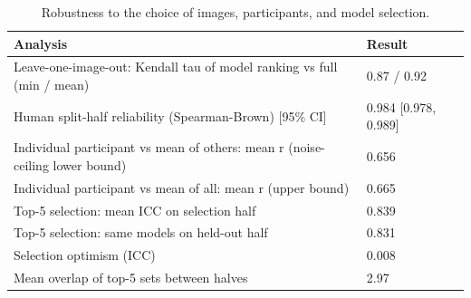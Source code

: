 \begin{table}
\caption{Robustness to the choice of images, participants, and model selection.}
\begin{tabular}{ll}
\toprule
Analysis & Result \\
\midrule
Leave-one-image-out: Kendall tau of model ranking vs full (min / mean) & 0.87 / 0.92 \\
Human split-half reliability (Spearman-Brown) [95\% CI] & 0.984 [0.978, 0.989] \\
Individual participant vs mean of others: mean r (noise-ceiling lower bound) & 0.656 \\
Individual participant vs mean of all: mean r (upper bound) & 0.665 \\
Top-5 selection: mean ICC on selection half & 0.839 \\
Top-5 selection: same models on held-out half & 0.831 \\
Selection optimism (ICC) & 0.008 \\
Mean overlap of top-5 sets between halves & 2.97 \\
\bottomrule
\end{tabular}
\end{table}
